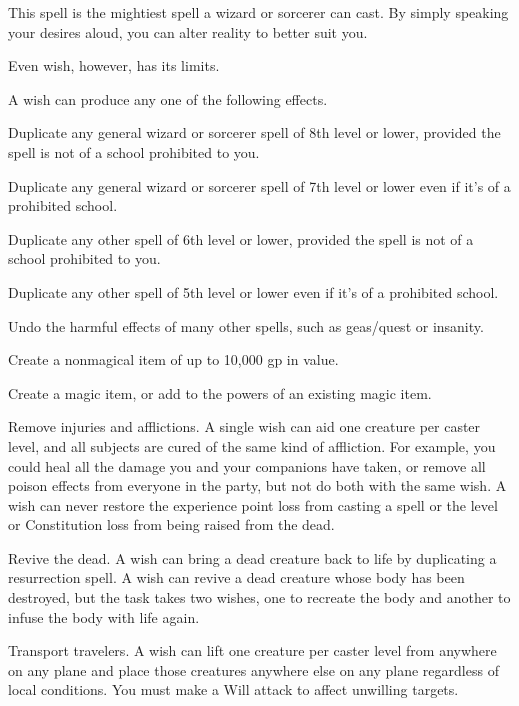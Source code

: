 \begin{spelleffect}
    This spell is the mightiest spell a wizard or sorcerer can cast. By simply speaking your desires aloud, you can alter reality to better suit you.
    \par Even wish, however, has its limits.
    \par A wish can produce any one of the following effects.
    \begin{itemize*}
        \item Duplicate any general wizard or sorcerer spell of 8th level or lower, provided the spell is not of a school prohibited to you.
        \item Duplicate any general wizard or sorcerer spell of 7th level or lower even if it's of a prohibited school.
        \item Duplicate any other spell of 6th level or lower, provided the spell is not of a school prohibited to you.
        \item Duplicate any other spell of 5th level or lower even if it's of a prohibited school. 
        \item Undo the harmful effects of many other spells, such as geas/quest or insanity.
        \item Create a nonmagical item of up to 10,000 gp in value.
        \item Create a magic item, or add to the powers of an existing magic item.
        \item Remove injuries and afflictions. A single wish can aid one creature per caster level, and all subjects are cured of the same kind of affliction. For example, you could heal all the damage you and your companions have taken, or remove all poison effects from everyone in the party, but not do both with the same wish. A wish can never restore the experience point loss from casting a spell or the level or Constitution loss from being raised from the dead.
        \item Revive the dead. A wish can bring a dead creature back to life by duplicating a resurrection spell. A wish can revive a dead creature whose body has been destroyed, but the task takes two wishes, one to recreate the body and another to infuse the body with life again.
        \item Transport travelers. A wish can lift one creature per caster level from anywhere on any plane and place those creatures anywhere else on any plane regardless of local conditions. You must make a Will attack to affect unwilling targets.

\end{itemize*}
\end{spelleffect}

